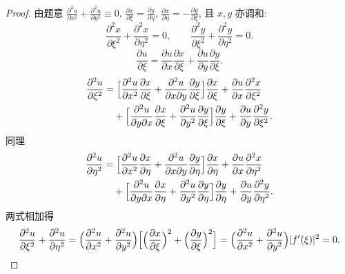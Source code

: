 \documentclass[theorem=false,mathfont=none,openany,sub3section]{easybook}
\begin{document}
\begin{proof}
  由题意 $\frac{\partial^{2}u}{\partial x^{2}}+\frac{\partial^{2}u}{\partial y^{2}}\equiv0$,
  $\frac{\partial x}{\partial\xi}=\frac{\partial y}{\partial\eta}$, $\frac{\partial x}{\partial\eta}=-\frac{\partial y}{\partial\xi}$,
  且 $x,y$ 亦调和:
  \[
  \frac{\partial^{2}x}{\partial\xi^{2}}+\frac{\partial^{2}x}{\partial\eta^{2}}=0,\qquad
  \frac{\partial^{2}y}{\partial\xi^{2}}+\frac{\partial^{2}y}{\partial\eta^{2}}=0.
  \]
  \[
  \frac{\partial u}{\partial\xi}=\frac{\partial u}{\partial x}\frac{\partial x}{\partial\xi}+\frac{\partial u}{\partial y}\frac{\partial y}{\partial\xi}.
  \]
  \[
  \begin{aligned}
  \frac{\partial^{2}u}{\partial\xi^{2}}
  &=\Bigl[\frac{\partial^{2}u}{\partial x^{2}}\frac{\partial x}{\partial\xi}+\frac{\partial^{2}u}{\partial x\partial y}\frac{\partial y}{\partial\xi}\Bigr]\frac{\partial x}{\partial\xi}
  +\frac{\partial u}{\partial x}\frac{\partial^{2}x}{\partial\xi^{2}}\\
  &\quad+\Bigl[\frac{\partial^{2}u}{\partial y\partial x}\frac{\partial x}{\partial\xi}+\frac{\partial^{2}u}{\partial y^{2}}\frac{\partial y}{\partial\xi}\Bigr]\frac{\partial y}{\partial\xi}
  +\frac{\partial u}{\partial y}\frac{\partial^{2}y}{\partial\xi^{2}}.
  \end{aligned}
  \]
  同理
  \[
  \begin{aligned}
  \frac{\partial^{2}u}{\partial\eta^{2}}
  &=\Bigl[\frac{\partial^{2}u}{\partial x^{2}}\frac{\partial x}{\partial\eta}+\frac{\partial^{2}u}{\partial x\partial y}\frac{\partial y}{\partial\eta}\Bigr]\frac{\partial x}{\partial\eta}
  +\frac{\partial u}{\partial x}\frac{\partial^{2}x}{\partial\eta^{2}}\\
  &\quad+\Bigl[\frac{\partial^{2}u}{\partial y\partial x}\frac{\partial x}{\partial\eta}+\frac{\partial^{2}u}{\partial y^{2}}\frac{\partial y}{\partial\eta}\Bigr]\frac{\partial y}{\partial\eta}
  +\frac{\partial u}{\partial y}\frac{\partial^{2}y}{\partial\eta^{2}}.
  \end{aligned}
  \]
  两式相加得
  \[
  \frac{\partial^{2}u}{\partial\xi^{2}}+\frac{\partial^{2}u}{\partial\eta^{2}}
  =\Bigl(\frac{\partial^{2}u}{\partial x^{2}}+\frac{\partial^{2}u}{\partial y^{2}}\Bigr)
  \Bigl[\Bigl(\frac{\partial x}{\partial\xi}\Bigr)^{2}+\Bigl(\frac{\partial y}{\partial\xi}\Bigr)^{2}\Bigr]
  =\Bigl(\frac{\partial^{2}u}{\partial x^{2}}+\frac{\partial^{2}u}{\partial y^{2}}\Bigr)\lvert f'(\xi)\rvert^{2}=0.
  \]
\end{proof}
\end{document}

